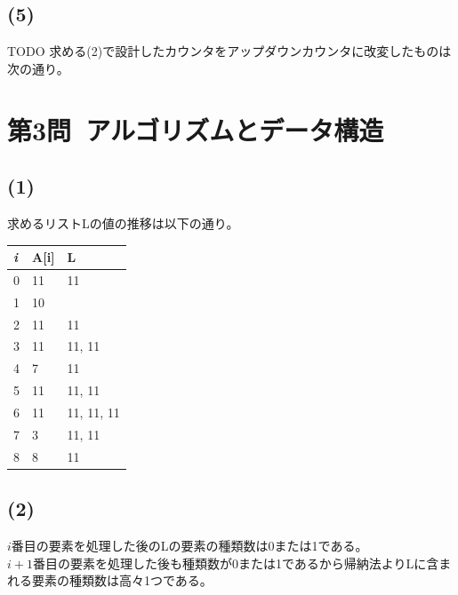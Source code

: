 \documentclass[a4paper,12pt,xelatex,ja=standard]{bxjsarticle}
\begin{document}
\subsection*{(5)}
TODO
求める(2)で設計したカウンタをアップダウンカウンタに改変したものは次の通り。

\section*{第3問\ アルゴリズムとデータ構造}
\subsection*{(1)}
求めるリストLの値の推移は以下の通り。
\begin{table}[]
  \begin{tabular}{|l|l|l|}
  \hline
  \textit{i} & A[i] & L            \\ \hline \hline
  0          & 11   & {11}         \\ \hline
  1          & 10   & {}           \\ \hline
  2          & 11   & {11}         \\ \hline
  3          & 11   & {11, 11}     \\ \hline
  4          & 7    & {11}         \\ \hline
  5          & 11   & {11, 11}     \\ \hline
  6          & 11   & {11, 11, 11} \\ \hline
  7          & 3    & {11, 11}     \\ \hline
  8          & 8    & {11}         \\ \hline
  \end{tabular}
\end{table}

\subsection*{(2)}
$i$番目の要素を処理した後のLの要素の種類数は0または1である。\\
$i+1$番目の要素を処理した後も種類数が0または1であるから帰納法よりLに含まれる要素の種類数は高々1つである。
\end{document}
